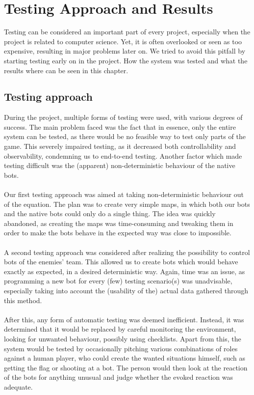 \chapter{Testing Approach and Results}

Testing can be considered an important part of every project, especially when the project is related to computer science. Yet, it is often overlooked or seen as too expensive, resulting in major problems later on. We tried to avoid this pitfall by starting testing early on in the project. How the system was tested and what the results where can be seen in this chapter.

\section{Testing approach}
During the project, multiple forms of testing were used, with various degrees of success. The main problem faced was the fact that in essence, only the entire system can be tested, as there would be no feasible way to test only parts of the game. This severely impaired testing, as it decreased both controllability and observability, condemning us to end-to-end testing. Another factor which made testing difficult was the (apparent) non-deterministic behaviour of the native bots.\\
\\
Our first testing approach was aimed at taking non-deterministic behaviour out of the equation. The plan was to create very simple maps, in which both our bots and the native bots could only do a single thing. The idea was quickly abandoned, as creating the maps was time-consuming and tweaking them in order to make the bots behave in the expected way was close to impossible.\\
\\
A second testing approach was considered after realizing the possibility to control bots of the enemies' team. This allowed us to create bots which would behave exactly as expected, in a desired deterministic way. Again, time was an issue, as programming a new bot for every (few) testing scenario(s) was unadvisable, especially taking into account the (usability of the) actual data gathered through this method.\\
\\
After this, any form of automatic testing was deemed inefficient. Instead, it was determined that it would be replaced by careful monitoring the environment, looking for unwanted behaviour, possibly using checklists. Apart from this, the system would be tested by occasionally pitching various combinations of roles against a human player, who could create the wanted situations himself, such as getting the flag or shooting at a bot. The person would then look at the reaction of the bots for anything unusual and judge whether the evoked reaction was adequate.\\

